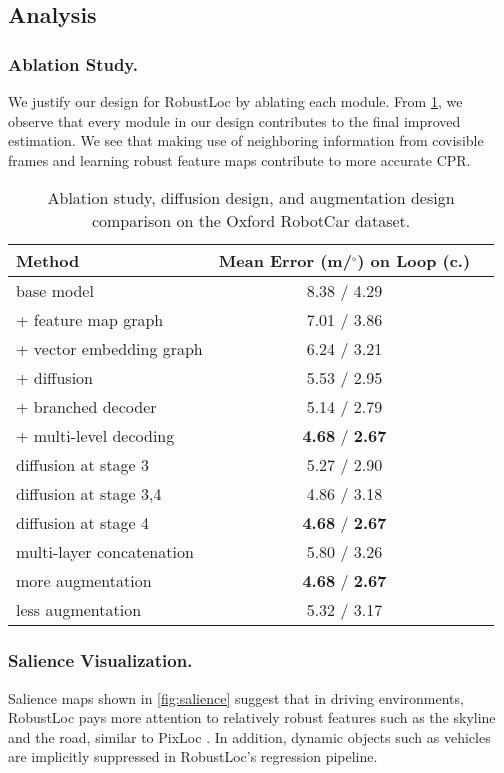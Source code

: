 \documentclass[letterpaper]{article} \usepackage{aaai23}  \usepackage{times}  \usepackage{helvet}  \usepackage{courier}  \usepackage[hyphens]{url}  \usepackage{graphicx} \urlstyle{rm} \def\UrlFont{\rm}  \usepackage{natbib}  \usepackage{caption} \frenchspacing  \setlength{\pdfpagewidth}{8.5in} \setlength{\pdfpageheight}{11in} \usepackage{booktabs}
\theoremstyle{remark}
\theoremstyle{plain}
\begin{document}
\subsection{Analysis}
\subsubsection{Ablation Study.}
We justify our design for RobustLoc by ablating each module. From \cref{tab:ablation study}, we observe that every module in our design contributes to the final improved estimation. We see that making use of neighboring information from covisible frames and learning robust feature maps contribute to more accurate CPR.

\begin{table}[!htb]\footnotesize
\centering
\begin{tabular}{l  c  c } 
\toprule
\multirow{1}{*}{Method} & \multicolumn{1}{c}{ Mean Error (m/$^\circ$) on Loop (c.)} \\
\midrule
base model  &  8.38 / 4.29 \\
+ feature map graph & 7.01 / 3.86 \\
+ vector embedding graph & 6.24 / 3.21\\
+ diffusion &  5.53 / 2.95\\
+ branched decoder &  5.14 / 2.79\\
+ multi-level decoding & \textbf{4.68} / \textbf{2.67} \\
\midrule
diffusion at stage 3 & 5.27 / 2.90  \\
diffusion at stage 3,4 & 4.86 / 3.18 \\
diffusion at stage 4 & \textbf{4.68} / \textbf{2.67}  \\
multi-layer concatenation & 5.80 / 3.26  \\
\midrule
more augmentation & \textbf{4.68} / \textbf{2.67}  \\
less augmentation & 5.32 / 3.17  \\
\bottomrule
\end{tabular}
\caption{Ablation study, diffusion design, and augmentation design comparison on the Oxford RobotCar dataset.}
\label{tab:ablation study}
\end{table}


\subsubsection{Salience Visualization.}
Salience maps shown in \cref{fig:salience} suggest that in driving environments, RobustLoc pays more attention to relatively robust features such as the skyline and the road, similar to PixLoc \cite{pixloc}. In addition, dynamic objects such as vehicles are implicitly suppressed in RobustLoc's regression pipeline.
\end{document}
